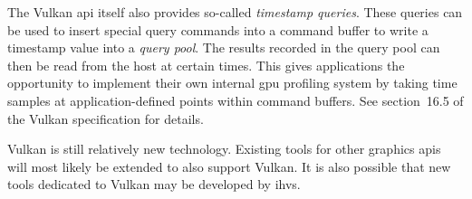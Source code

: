     The Vulkan \gls{api} itself also provides so-called \textit{timestamp queries}.
    These queries can be used to insert special query commands into a command buffer to write a timestamp value into a \textit{query pool}.
    The results recorded in the query pool can then be read from the host at certain times.
    This gives applications the opportunity to implement their own internal \gls{gpu} profiling system by taking time samples at application-defined points within command buffers.
    See section~16.5 of the Vulkan specification\cite{vkspec} for details.

    Vulkan is still relatively new technology.
    Existing tools for other graphics \glspl{api} will most likely be extended to also support Vulkan.
    It is also possible that new tools dedicated to Vulkan may be developed by \glspl{ihv}.
